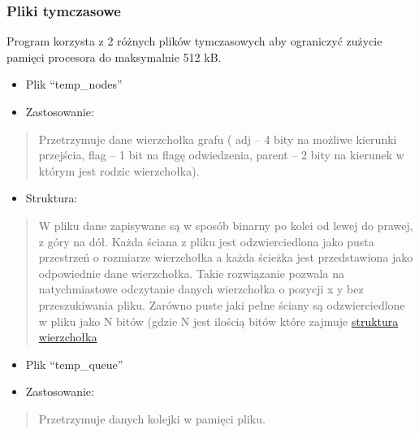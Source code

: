 \documentclass[
]{article}
\begin{document}
\hypertarget{pliki-tymczasowe}{%
\subsubsection{Pliki tymczasowe}\label{pliki-tymczasowe}}

Program korzysta z 2 różnych plików tymczasowych aby ograniczyć zużycie
pamięci procesora do maksymalnie 512 kB.

\begin{itemize}
\item
  Plik ``temp\_nodes''
\end{itemize}

\begin{itemize}
\item
  Zastosowanie:
\end{itemize}

\begin{quote}
Przetrzymuje dane wierzchołka grafu ( adj -- 4 bity na możliwe kierunki
przejścia, flag -- 1 bit na flagę odwiedzenia, parent -- 2 bity na
kierunek w którym jest rodzic wierzchołka).
\end{quote}

\begin{itemize}
\item
  Struktura:
\end{itemize}

\begin{quote}
W pliku dane zapisywane są w sposób binarny po kolei od lewej do prawej,
z góry na dół. Każda ściana z pliku jest odzwierciedlona jako pusta
przestrzeń o rozmiarze wierzchołka a każda ścieżka jest przedstawiona
jako odpowiednie dane wierzchołka. Takie
rozwiązanie pozwala na natychmiastowe odczytanie danych wierzchołka o
pozycji x y bez przeszukiwania pliku. Zarówno puste jaki pełne ściany są
odzwierciedlone w pliku jako N bitów (gdzie N jest ilością bitów które
zajmuje \hyperref[struktury-programu]{struktura wierzchołka}
\end{quote}

\begin{itemize}
\item
  Plik ``temp\_queue''
\end{itemize}

\begin{itemize}
\item
  Zastosowanie:
\end{itemize}

\begin{quote}
Przetrzymuje danych kolejki w pamięci pliku.
\end{quote}
\end{document}

